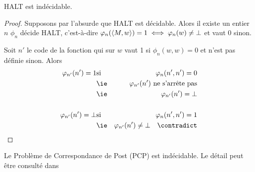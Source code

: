 \begin{prop}
	HALT est indécidable.
\end{prop}

\begin{proof}
	Supposons par l'absurde que HALT est décidable. Alors il existe un entier $n$ \tq $\phi_n$ décide HALT, c'est-à-dire
	$ \varphi_n(\left\langle M, w\right\rangle ) = 1 \iff \varphi_n(w) \neq \bot $ et vaut $0$ sinon.

	Soit $n'$ le code de la fonction qui sur $w$ vaut 1 si $\phi_n (w,w) = 0 $ et n'est pas définie sinon. Alors
	\begin{eqnarray*}
		\phi_{n'}(n') = 1 & \text{si} & \phi_n(n',n') = 0\\
		&\text{\ie}& \phi_{n'}(n') \text{ ne s'arrête pas} \\
		&\text{\ie}& \phi_{n'}(n') = \bot\\\\
		\phi_{n'}(n') = \bot & \text{si} & \phi_n(n',n') = 1\\
		&\text{\ie}& \phi_{n'}(n') \neq \bot \quad \contradict
	\end{eqnarray*}
\end{proof}

\begin{exemple}
	Le Problème de Correspondance de Post (PCP) est indécidable. Le détail peut être consulté dans \cite[Chapter~5.2]{sipser}
\end{exemple}
